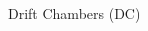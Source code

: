 \begin{frame}{Drift Chambers (DC)}
\begin{columns}[onlytextwidth,T]
\begin{column}{.55\linewidth}
    \end{column}

    \end{columns}
\end{frame}

